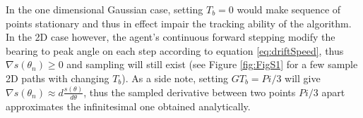 In the one dimensional Gaussian case, setting $T_b = 0$ would make sequence of points stationary and thus in effect impair the tracking ability of the algorithm. In the 2D case however, the agent's continuous forward stepping modify the bearing to peak angle on each step according to equation \eqref{eq:driftSpeed}, thus $\nabla s(\theta_n) \geq 0$  and sampling will still exist (see Figure \ref{fig:FigS1} for a few sample 2D paths with changing $T_b$).
As a side note, setting $G T_b = Pi/3$ will give $\nabla s(\theta_n) \approx d\frac{s(\theta)}{d\theta}$, thus the sampled derivative between two points $Pi/3$ apart approximates the infinitesimal one obtained analytically.


%
%
%

